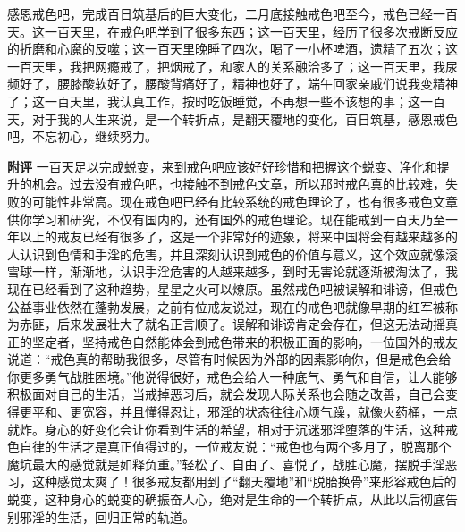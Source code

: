 \begin{case}
    感恩戒色吧，完成百日筑基后的巨大变化，二月底接触戒色吧至今，戒色已经一百天。这一百天里，在戒色吧学到了很多东西；这一百天里，经历了很多次戒断反应的折磨和心魔的反噬；这一百天里晚睡了四次，喝了一小杯啤酒，遗精了五次；这一百天里，我把网瘾戒了，把烟戒了，和家人的关系融洽多了；这一百天里，我尿频好了，腰膝酸软好了，腰酸背痛好了，精神也好了，端午回家亲戚们说我变精神了；这一百天里，我认真工作，按时吃饭睡觉，不再想一些不该想的事；这一百天，对于我的人生来说，是一个转折点，是翻天覆地的变化，百日筑基，感恩戒色吧，不忘初心，继续努力。

    \textbf{附评} 一百天足以完成蜕变，来到戒色吧应该好好珍惜和把握这个蜕变、净化和提升的机会。过去没有戒色吧，也接触不到戒色文章，所以那时戒色真的比较难，失败的可能性非常高。现在戒色吧已经有比较系统的戒色理论了，也有很多戒色文章供你学习和研究，不仅有国内的，还有国外的戒色理论。现在能戒到一百天乃至一年以上的戒友已经有很多了，这是一个非常好的迹象，将来中国将会有越来越多的人认识到色情和手淫的危害，并且深刻认识到戒色的价值与意义，这个效应就像滚雪球一样，渐渐地，认识手淫危害的人越来越多，到时无害论就逐渐被淘汰了，我现在已经看到了这种趋势，星星之火可以燎原。虽然戒色吧被误解和诽谤，但戒色公益事业依然在蓬勃发展，之前有位戒友说过，现在的戒色吧就像早期的红军被称为赤匪，后来发展壮大了就名正言顺了。误解和诽谤肯定会存在，但这无法动摇真正的坚定者，坚持戒色自然能体会到戒色带来的积极正面的影响，一位国外的戒友说道：“戒色真的帮助我很多，尽管有时候因为外部的因素影响你，但是戒色会给你更多勇气战胜困境。”他说得很好，戒色会给人一种底气、勇气和自信，让人能够积极面对自己的生活，当戒掉恶习后，就会发现人际关系也会随之改善，自己会变得更平和、更宽容，并且懂得忍让，邪淫的状态往往心烦气躁，就像火药桶，一点就炸。身心的好变化会让你看到生活的希望，相对于沉迷邪淫堕落的生活，这种戒色自律的生活才是真正值得过的，一位戒友说：“戒色也有两个多月了，脱离那个魔坑最大的感觉就是如释负重。”轻松了、自由了、喜悦了，战胜心魔，摆脱手淫恶习，这种感觉太爽了！很多戒友都用到了“翻天覆地”和“脱胎换骨”来形容戒色后的蜕变，这种身心的蜕变的确振奋人心，绝对是生命的一个转折点，从此以后彻底告别邪淫的生活，回归正常的轨道。
\end{case}

